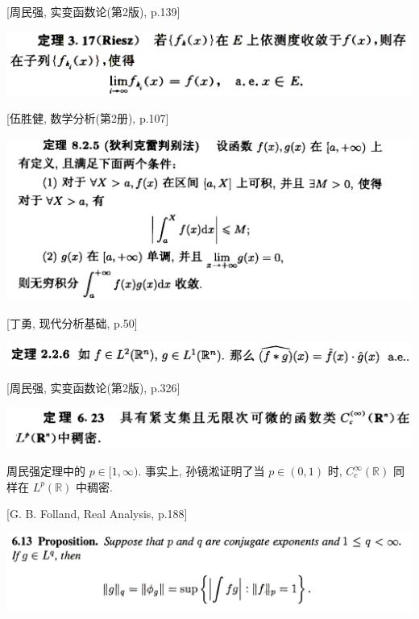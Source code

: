 \documentclass[a4paper,11pt]{article}
\theoremstyle{definition}
\begin{document}
\begin{framed}
\setlength{\parindent}{0pt}
[周民强, 实变函数论(第2版), p.139]
\vspace{0.1cm}
    
\includegraphics[width=\textwidth]{picture/riesz.PNG}
\end{framed}

\newpage

\begin{framed}
\setlength{\parindent}{0pt}
[伍胜健, 数学分析(第2册), p.107]
\vspace{0.1cm}
    
\includegraphics[width=\textwidth]{picture/dirichlet.PNG}
\end{framed}


\begin{framed}
\setlength{\parindent}{0pt}
[丁勇, 现代分析基础, p.50]
\vspace{0.1cm}

\includegraphics[width=\textwidth]{picture/convolution.PNG}
\end{framed}

\begin{framed}
\setlength{\parindent}{0pt}
[周民强, 实变函数论(第2版), p.326]
\vspace{0.1cm}

\includegraphics[width=\textwidth]{picture/dense.PNG}
\end{framed}

周民强定理中的 $ p \in [1, \infty) $. 
事实上, 孙镜淞证明了当 $ p \in (0, 1) $ 时,
$ C_c^\infty(\mathbb{R}) $ 同样在 $ L^p(\mathbb{R}) $ 中稠密.


\begin{framed}
\setlength{\parindent}{0pt}
[G. B. Folland, Real Analysis, p.188]
\vspace{0.1cm}

\includegraphics[width=\textwidth]{picture/dual.PNG}
\end{framed}
\end{document}
